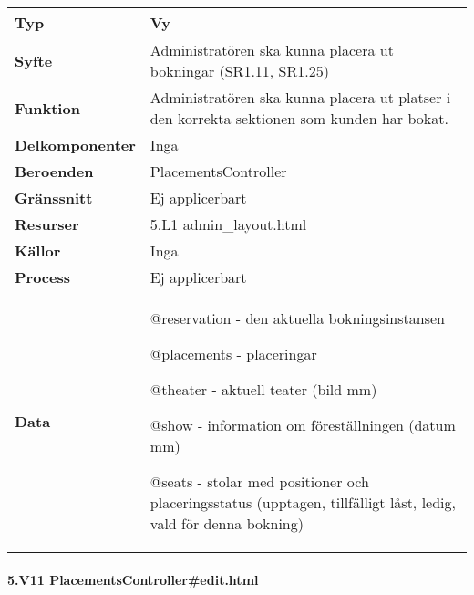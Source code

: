 \documentclass[a4paper, twoside, 11pt, titlepage]{article}
\begin{document}
			\begin {table} [ht] \begin{tabular} {  p{3.5cm} p{11.6cm} }
				\hline
				{\sffamily\textbf{Typ}} & {Vy} \\
				\hline
				{\sffamily\textbf{Syfte}} & {Administratören ska kunna placera ut bokningar (SR1.11, SR1.25)} \\
				\hline
				{\sffamily\textbf{Funktion}} & {Administratören ska kunna placera ut platser i den korrekta sektionen som kunden har bokat.} \\
				\hline
				{\sffamily\textbf{Delkomponenter}} & {Inga} \\
				\hline
				{\sffamily\textbf{Beroenden}} & {PlacementsController} \\
				\hline
				{\sffamily\textbf{Gränssnitt}} & {Ej applicerbart} \\
				\hline
				{\sffamily\textbf{Resurser}} & {5.L1 admin\_layout.html} \\
				\hline
				{\sffamily\textbf{Källor}} & {Inga} \\
				\hline
				{\sffamily\textbf{Process}} & {Ej applicerbart} \\
				\hline
				{\sffamily\textbf{Data}} & {@reservation - den aktuella bokningsinstansen

@placements - placeringar

@theater - aktuell teater (bild mm)

@show - information om föreställningen (datum mm)

@seats - stolar med positioner och placeringsstatus (upptagen, tillfälligt låst, ledig, vald för denna bokning)} \\
				\hline
			\end{tabular} \end{table} \FloatBarrier


			\paragraph{5.V11 PlacementsController\#edit.html}\
\end{document}
